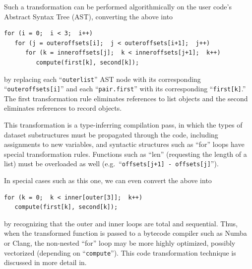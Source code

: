\documentclass[a4paper]{jpconf}
\begin{document}
Such a transformation can be performed algorithmically on the user code's Abstract Syntax Tree (AST), converting the above into
\begin{center}
\begin{minipage}{0.7\linewidth}
\begin{verbatim}
for (i = 0;  i < 3;  i++)
   for (j = outeroffsets[i];  j < outeroffsets[i+1];  j++)
      for (k = inneroffsets[j];  k < inneroffsets[j+1];  k++)
         compute(first[k], second[k]);
\end{verbatim}
\end{minipage}
\end{center}
by replacing each ``{\tt outerlist}'' AST node with its corresponding ``{\tt outeroffsets[i]}'' and each ``{\tt pair.first}'' with its corresponding ``{\tt first[k]}.'' The first transformation rule eliminates references to list objects and the second eliminates references to record objects.

This transformation is a type-inferring compilation pass, in which the types of dataset substructures must be propagated through the code, including assignments to new variables, and syntactic structures such as ``for'' loops have special transformation rules. Functions such as ``len'' (requesting the length of a list) must be overloaded as well (e.g.\ ``{\tt offsets[j+1] - offsets[j]}'').

In special cases such as this one, we can even convert the above into
\begin{center}
\begin{minipage}{0.7\linewidth}
\begin{verbatim}
for (k = 0;  k < inner[outer[3]];  k++)
   compute(first[k], second[k]);
\end{verbatim}
\end{minipage}
\end{center}
by recognizing that the outer and inner loops are total and sequential. Thus, when the transformed function is passed to a bytecode compiler such as Numba or Clang, the non-nested ``for'' loop may be more highly optimized, possibly vectorized (depending on ``{\tt compute}''). This code transformation technique is discussed in more detail in\cite{ieee}.
\end{document}
